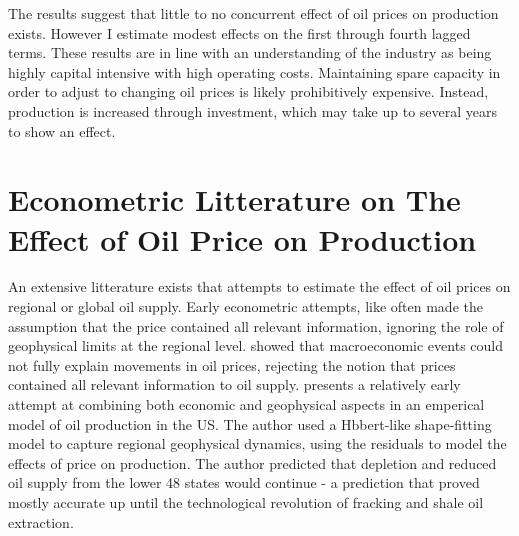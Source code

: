 \documentclass[12pt]{article}
\begin{document}
The results suggest that little to no concurrent effect of oil prices on production exists.  However I estimate modest effects on the first through fourth lagged terms. These results are in line with an understanding of the industry as being highly capital intensive with high operating costs.  Maintaining spare capacity in order to adjust to changing oil prices is likely prohibitively expensive.  Instead, production is increased through investment, which may take up to several years to show an effect.

\section{Econometric Litterature on The Effect of Oil Price on Production}


An extensive litterature exists that attempts to estimate the effect of oil prices on regional or global oil supply. Early econometric attempts, like \citet{adelman_fea_1975} often made the assumption that the price contained all relevant information, ignoring the role of geophysical limits at the regional level. \citet{hamilton_oil_1983} showed that macroeconomic events could not fully explain movements in oil prices, rejecting the notion that prices contained all relevant information to oil supply. \citet{kaufmann_oil_1991} presents a relatively early attempt at combining both economic and geophysical aspects in an emperical model of oil production in the US. The author used a Hbbert-like \citep{hubbert_energy_1962} shape-fitting model to capture regional geophysical dynamics, using the residuals to model the effects of price on production. The author predicted that depletion and reduced oil supply from the lower 48 states would continue - a prediction that proved mostly accurate up until the technological revolution of fracking and shale oil extraction. 
\end{document}
